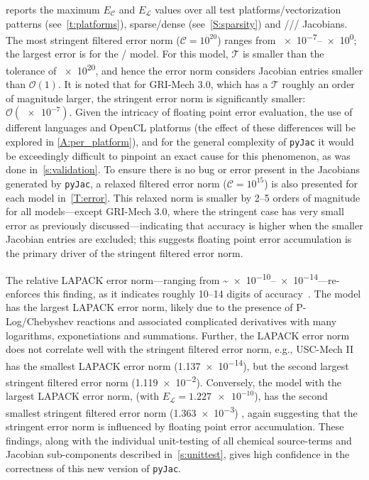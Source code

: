 \documentclass[12pt,number,sort&compress,preprint]{elsarticle}
\begin{document}
 reports the maximum $E_{\mathcal{C}}$ and $E_{\mathcal{L}}$ values over all test platforms\slash vectorization patterns (see~\cref{t:platforms}), sparse\slash dense (see~\cref{S:sparsity}) and \conp/\slash\conv/ Jacobians.
The most stringent filtered error norm ($\mathcal{C} = 10^{20}$) ranges from \numrange[retain-zero-exponent=true]{e-7}{e0}; the largest error is for the \slash{} model.
For this model, $\mathcal{T}$  is smaller than the tolerance of \num{e20}, and hence the error norm considers Jacobian entries smaller than $\mathcal{O}(1)$.
It is noted that for GRI-Mech 3.0, which has a $\mathcal{T}$ roughly an order of magnitude larger, the stringent error norm is significantly smaller: $\mathcal{O}(\num{e-7})$.
Given the intricacy of floating point error evaluation, the use of different languages and OpenCL platforms (the effect of these differences will be explored in \cref{A:per_platform}), and for the general complexity of \texttt{pyJac} it would be exceedingly difficult to pinpoint an exact cause for this phenomenon, as was done in~\cref{s:validation}.
To ensure there is no bug or error present in the Jacobians generated by \texttt{pyJac}, a relaxed filtered error norm ($\mathcal{C} = 10^{15}$) is also presented for each model in~\cref{T:error}.
This relaxed norm is smaller by \numrange{2}{5} orders of magnitude for all models---except GRI-Mech 3.0, where the stringent case has very small error as previously discussed---indicating that accuracy is higher when the smaller Jacobian entries are excluded; this suggests floating point error accumulation is the primary driver of the stringent filtered error norm.

The relative LAPACK error norm---ranging from \textasciitilde\numrange{e-10}{e-14}---re-enforces this finding, as it indicates roughly \numrange{10}{14} digits of accuracy~\cite{Anderson:1999aa}.
The  model has the largest LAPACK error norm, likely due to the presence of P-Log\slash Chebyshev reactions and associated complicated derivatives with many logarithms, exponetiations and summations.
Further, the LAPACK error norm does not correlate well with the stringent filtered error norm, e.g., USC-Mech II has the smallest LAPACK error norm (\num{1.137e-14}), but the second largest stringent filtered error norm (\num{1.119e-2}).
Conversely, the model with the largest LAPACK error norm,  (with $E_{\mathcal{L}} = \num{1.227e-10}$), has the second smallest stringent filtered error norm (\num{1.363e-3}) , again suggesting that the stringent error norm is influenced by floating point error accumulation.
These findings, along with the individual unit-testing of all chemical source-terms and Jacobian sub-components described in~\cref{s:unittest}, gives high confidence in the correctness of this new version of \texttt{pyJac}.
\end{document}
